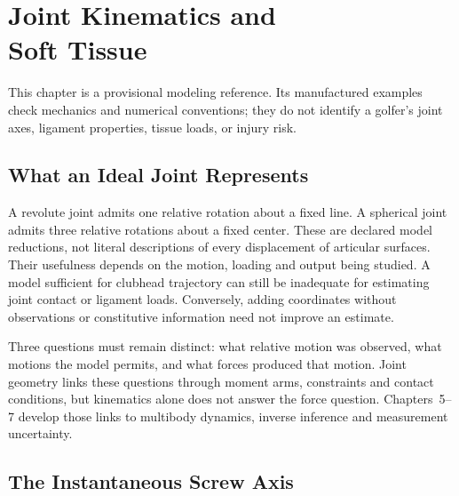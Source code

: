 \chapter[Joint Kinematics and Soft Tissue]{Joint Kinematics and\\Soft Tissue}
\label{ch:joint-kinematics}

\begin{gomdraftnotice}
This chapter is a provisional modeling reference. Its manufactured examples check
mechanics and numerical conventions; they do not identify a golfer's joint axes,
ligament properties, tissue loads, or injury risk.
\end{gomdraftnotice}

\section{What an Ideal Joint Represents}

A revolute joint admits one relative rotation about a fixed line. A spherical
joint admits three relative rotations about a fixed center. These are declared
model reductions, not literal descriptions of every displacement of articular
surfaces. Their usefulness depends on the motion, loading and output being studied.
A model sufficient for clubhead trajectory can still be inadequate for estimating
joint contact or ligament loads. Conversely, adding coordinates without observations
or constitutive information need not improve an estimate.

Three questions must remain distinct: what relative motion was observed, what
motions the model permits, and what forces produced that motion. Joint geometry
links these questions through moment arms, constraints and contact conditions, but
kinematics alone does not answer the force question. Chapters~5--7 develop those
links to multibody dynamics, inverse inference and measurement uncertainty.

\section{The Instantaneous Screw Axis}

